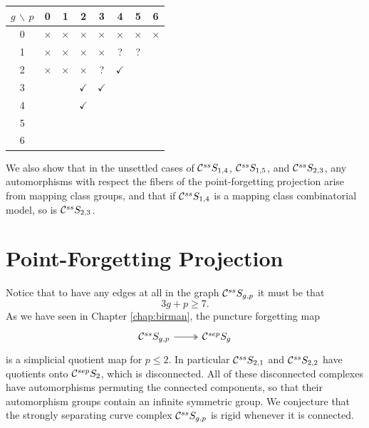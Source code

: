 \begin{tabular}{ | c | c| c| c| c| c| c|c| }
  \hline
  $g$ $\backslash$ $p$ & 0 & 1 & 2 & 3 & 4 & 5 & 6  \\
  \hline
  0 & {\color{red}$\times$} & {\color{red}$\times$} & {\color{red}$\times$} & {\color{red}$\times$} & {\color{red}$\times$} & {\color{red}$\times$} & {\color{red}$\times$} \\
  \hline
  1 & {\color{red}$\times$} & {\color{red}$\times$} & {\color{red}$\times$} & {\color{red}$\times$} & ? & ?  & \cite{bowditch} \\
  \hline
  2 & {\color{red}$\times$} & {\color{red}$\times$} & {\color{red}$\times$} &  ? & {\color{green}$\checkmark$} & \cite{bowditch}  & \cite{bowditch} \\
  \hline
  3 & \cite{commensurations} &\cite{kida} & {\color{green}$\checkmark$} & {\color{green}$\checkmark$} &\cite{bowditch}& \cite{bowditch}&\cite{bowditch} \\
  \hline
  4 & \cite{commensurations} &\cite{kida}& {\color{green}$\checkmark$}  & \cite{bowditch}&\cite{bowditch}&\cite{bowditch}&\cite{bowditch} \\
  \hline
  5 & \cite{commensurations} &\cite{kida}&\cite{bowditch}&\cite{bowditch}&\cite{bowditch}&\cite{bowditch}&\cite{bowditch} \\
  \hline
  6 & \cite{commensurations} &\cite{kida}& \cite{bowditch} & \cite{bowditch}& \cite{bowditch}& \cite{bowditch} & \cite{bowditch} \\
  \hline
\end{tabular}

We also show that in the unsettled cases of $ \mathcal C^{{ss}}  S_{1,4}$, $ \mathcal C^{{ss}}  S_{1,5}$, and $ \mathcal C^{{ss}}  S_{2,3}$,
any automorphisms with respect the fibers of the point-forgetting projection arise from mapping class groups,
and that if $ \mathcal C^{{ss}}  S_{1,4}$ is a mapping class combinatorial model, so is $ \mathcal C^{{ss}}  S_{2,3}$.

\section{Point-Forgetting Projection}
\label{sect:strongpoint}

Notice that to have any edges at all in the graph $ \mathcal C^{{ss}}  S_{g,p}$ it must be that $$3g+p \geq 7.$$
As we have seen in Chapter \ref{chap:birman}, the puncture forgetting map
$$
\begin{tikzcd}
\css S_{g,p} \arrow[r, twoheadrightarrow] & \csep S_g
\end{tikzcd}
$$
is a simplicial quotient map for $p \leq 2$.
In particular $ \mathcal C^{{ss}}  S_{2,1}$ and $ \mathcal C^{{ss}}  S_{2,2}$
have quotients onto $ \mathcal C^{{sep}}  S_{2}$, which is disconnected.
All of these disconnected complexes have automorphisms permuting
the connected components, so that their automorphism groups contain an infinite symmetric group.
We conjecture that the strongly separating curve complex $ \mathcal C^{{ss}}  S_{g,p}$
is rigid whenever it
 is connected.

